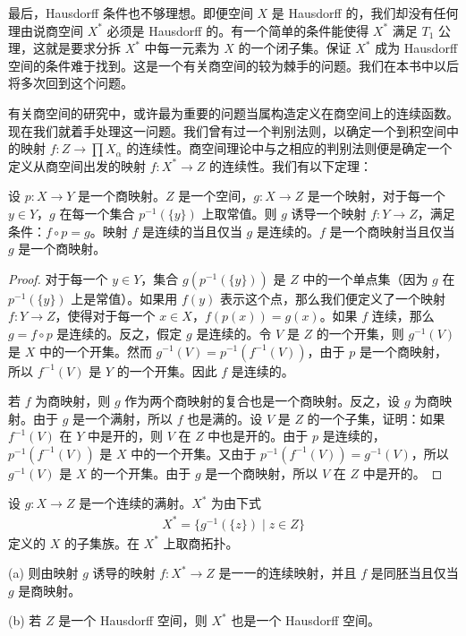 \documentclass[../../main.tex]{subfiles}
\begin{document}
最后，Hausdorff 条件也不够理想。即便空间 $X$ 是 Hausdorff 的，我们却没有任何理由说商空间 $X^{*}$ 必须是 Hausdorff 的。有一个简单的条件能使得 $X^{*}$ 满足 $T_{1}$ 公理，这就是要求分拆 $X^{*}$ 中每一元素为 $X$ 的一个闭子集。保证 $X^{*}$ 成为 Hausdorff 空间的条件难于找到。这是一个有关商空间的较为棘手的问题。我们在本书中以后将多次回到这个问题。

有关商空间的研究中，或许最为重要的问题当属构造定义在商空间上的连续函数。现在我们就着手处理这一问题。我们曾有过一个判别法则，以确定一个到积空间中的映射 $f: Z \rightarrow \prod X_{\alpha}$ 的连续性。商空间理论中与之相应的判别法则便是确定一个定义从商空间出发的映射 $f: X^{*} \rightarrow Z$ 的连续性。我们有以下定理：

\begin{theorem}[商空间上映射的连续性]\label{theorem:ch02-商空间连续映射}
设 $p: X \rightarrow Y$ 是一个商映射。$Z$ 是一个空间，$g: X \rightarrow Z$ 是一个映射，对于每一个 $y \in Y$，$g$ 在每一个集合 $p^{-1}(\{y\})$ 上取常值。则 $g$ 诱导一个映射 $f: Y \rightarrow Z$，满足条件：$f \circ p = g$。映射 $f$ 是连续的当且仅当 $g$ 是连续的。$f$ 是一个商映射当且仅当 $g$ 是一个商映射。
\end{theorem}

\begin{proof}
对于每一个 $y \in Y$，集合 $g(p^{-1}(\{y\}))$ 是 $Z$ 中的一个单点集（因为 $g$ 在 $p^{-1}(\{y\})$ 上是常值）。如果用 $f(y)$ 表示这个点，那么我们便定义了一个映射 $f: Y \rightarrow Z$，使得对于每一个 $x \in X$，$f(p(x)) = g(x)$。如果 $f$ 连续，那么 $g = f \circ p$ 是连续的。反之，假定 $g$ 是连续的。令 $V$ 是 $Z$ 的一个开集，则 $g^{-1}(V)$ 是 $X$ 中的一个开集。然而 $g^{-1}(V) = p^{-1}(f^{-1}(V))$，由于 $p$ 是一个商映射，所以 $f^{-1}(V)$ 是 $Y$ 的一个开集。因此 $f$ 是连续的。

若 $f$ 为商映射，则 $g$ 作为两个商映射的复合也是一个商映射。反之，设 $g$ 为商映射。由于 $g$ 是一个满射，所以 $f$ 也是满的。设 $V$ 是 $Z$ 的一个子集，证明：如果 $f^{-1}(V)$ 在 $Y$ 中是开的，则 $V$ 在 $Z$ 中也是开的。由于 $p$ 是连续的，$p^{-1}(f^{-1}(V))$ 是 $X$ 中的一个开集。又由于 $p^{-1}(f^{-1}(V)) = g^{-1}(V)$，所以 $g^{-1}(V)$ 是 $X$ 的一个开集。由于 $g$ 是一个商映射，所以 $V$ 在 $Z$ 中是开的。
\end{proof}

\begin{corollary}\label{corollary:ch02-商空间同胚}
设 $g: X \rightarrow Z$ 是一个连续的满射。$X^{*}$ 为由下式
\begin{align*}
X^{*} = \{g^{-1}(\{z\}) \mid z \in Z\}
\end{align*}
定义的 $X$ 的子集族。在 $X^{*}$ 上取商拓扑。

(a) 则由映射 $g$ 诱导的映射 $f: X^{*} \rightarrow Z$ 是一一的连续映射，并且 $f$ 是同胚当且仅当 $g$ 是商映射。

(b) 若 $Z$ 是一个 Hausdorff 空间，则 $X^{*}$ 也是一个 Hausdorff 空间。
\end{corollary}
\end{document}
